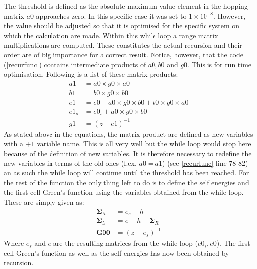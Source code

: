 The threshold is defined as the absolute maximum value element in the hopping matrix \(a0\) approaches zero. In this specific case it was set to \(1\times10^{-8} \). However, the value should be adjusted so that it is optimised for the specific system on which the calculation are made. Within this while loop a range matrix multiplications are computed. These constitutes the actual recursion and their order are of big importance for a correct result. Notice, however, that the code (\cref{recurfunc}) contains intermediate products of \(a0, b0\) and \(g0\). This is for run time optimisation. Following is a list of these matrix products:
\begin{align*}
	a1     & = a0 \times g0 \times a0                   \\
	b1     & = b0\times g0\times b0                   \\
	e1     & = e0 + a0\times g0\times b0 + b0\times g0\times a0 \\
	e1_{s} & = e0_{s} + a0\times g0\times b0          \\
	g1     & = (z - e1)^{-1}
\end{align*}
As stated above in the equations, the matrix product are defined as new variables with a \(+1\) variable name. This is all very well but the while loop would stop here because of the definition of new variables. It is therefore necessary to redefine the new variables in terms of the old ones (f.ex. \(a0 = a1\)) (see \cref{recurfunc} line 78-82) an as such the while loop will continue until the threshold has been reached. For the rest of the function the only thing left to do is to define the self energies and the first cell Green's function using the variables obtained from the while loop. These are simply given as:
\begin{align}\label{outputs}
	\mathbf{\Sigma}_R & = e_s - h                   \\ \nonumber
	\mathbf{\Sigma}_L & = e - h - \mathbf{\Sigma}_R \\ \nonumber
	\mathbf{G00}      & = (z - e_s)^{-1}
\end{align}
Where \(e_s\) and \(e\) are the resulting matrices from the while loop (\(e0_s, e0\)). The first cell Green's function as well as the self energies has now been obtained by recursion.
